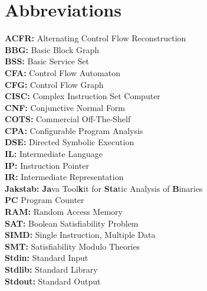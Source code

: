 \documentclass{kththesis}
\begin{document}
\section*{Abbreviations}
\textbf{ACFR:} Alternating Control Flow Reconstruction\\
\textbf{BBG:} Basic Block Graph\\
\textbf{BSS:} Basic Service Set\\
\textbf{CFA:} Control Flow Automaton\\
\textbf{CFG:} Control Flow Graph\\
\textbf{CISC:} Complex Instruction Set Computer\\
\textbf{CNF:} Conjunctive Normal Form\\
\textbf{COTS:} Commercial Off-The-Shelf\\
\textbf{CPA:} Configurable Program Analysis \\
\textbf{DSE:} Directed Symbolic Execution\\
\textbf{IL:} Intermediate Language\\
\textbf{IP:} Instruction Pointer\\
\textbf{IR:} Intermediate Representation\\
\textbf{Jakstab:} \textbf{Ja}va Tool\textbf{k}it for \textbf{Sta}tic Analysis of \textbf{B}inaries\\
\textbf{PC} Program Counter\\
\textbf{RAM:} Random Access Memory\\
\textbf{SAT:} Boolean Satisfiability Problem\\
\textbf{SIMD:} Single Instruction, Multiple Data\\
\textbf{SMT:} Satisfiability Modulo Theories\\
\textbf{Stdin:} Standard Input\\
\textbf{Stdlib:} Standard Library\\
\textbf{Stdout:} Standard Output\\

\clearpage
\thispagestyle{empty}
\end{document}
